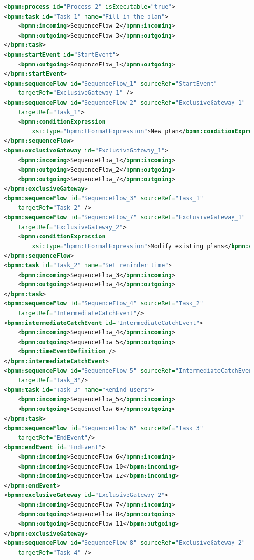 \documentclass[runningheads]{llncs}
\begin{document}
    \begin{lstlisting}[language={XML}]
        <bpmn:process id="Process_2" isExecutable="true">
<bpmn:task id="Task_1" name="Fill in the plan">
    <bpmn:incoming>SequenceFlow_2</bpmn:incoming>
    <bpmn:outgoing>SequenceFlow_3</bpmn:outgoing>
</bpmn:task>
<bpmn:startEvent id="StartEvent">
    <bpmn:outgoing>SequenceFlow_1</bpmn:outgoing>
</bpmn:startEvent>
<bpmn:sequenceFlow id="SequenceFlow_1" sourceRef="StartEvent"
    targetRef="ExclusiveGateway_1" />
<bpmn:sequenceFlow id="SequenceFlow_2" sourceRef="ExclusiveGateway_1"
    targetRef="Task_1">
    <bpmn:conditionExpression
        xsi:type="bpmn:tFormalExpression">New plan</bpmn:conditionExpression>
</bpmn:sequenceFlow>
<bpmn:exclusiveGateway id="ExclusiveGateway_1">
    <bpmn:incoming>SequenceFlow_1</bpmn:incoming>
    <bpmn:outgoing>SequenceFlow_2</bpmn:outgoing>
    <bpmn:outgoing>SequenceFlow_7</bpmn:outgoing>
</bpmn:exclusiveGateway>
<bpmn:sequenceFlow id="SequenceFlow_3" sourceRef="Task_1"
    targetRef="Task_2" />
<bpmn:sequenceFlow id="SequenceFlow_7" sourceRef="ExclusiveGateway_1"
    targetRef="ExclusiveGateway_2">
    <bpmn:conditionExpression
        xsi:type="bpmn:tFormalExpression">Modify existing plans</bpmn:conditionExpression>
</bpmn:sequenceFlow>
<bpmn:task id="Task_2" name="Set reminder time">
    <bpmn:incoming>SequenceFlow_3</bpmn:incoming>
    <bpmn:outgoing>SequenceFlow_4</bpmn:outgoing>
</bpmn:task>
<bpmn:sequenceFlow id="SequenceFlow_4" sourceRef="Task_2"
    targetRef="IntermediateCatchEvent"/>
<bpmn:intermediateCatchEvent id="IntermediateCatchEvent">
    <bpmn:incoming>SequenceFlow_4</bpmn:incoming>
    <bpmn:outgoing>SequenceFlow_5</bpmn:outgoing>
    <bpmn:timeEventDefinition />
</bpmn:intermediateCatchEvent>
<bpmn:sequenceFlow id="SequenceFlow_5" sourceRef="IntermediateCatchEvent"
    targetRef="Task_3"/>
<bpmn:task id="Task_3" name="Remind users">
    <bpmn:incoming>SequenceFlow_5</bpmn:incoming>
    <bpmn:outgoing>SequenceFlow_6</bpmn:outgoing>
</bpmn:task>
<bpmn:sequenceFlow id="SequenceFlow_6" sourceRef="Task_3"
    targetRef="EndEvent"/>
<bpmn:endEvent id="EndEvent">
    <bpmn:incoming>SequenceFlow_6</bpmn:incoming>
    <bpmn:incoming>SequenceFlow_10</bpmn:incoming>
    <bpmn:incoming>SequenceFlow_12</bpmn:incoming>
</bpmn:endEvent>
<bpmn:exclusiveGateway id="ExclusiveGateway_2">
    <bpmn:incoming>SequenceFlow_7</bpmn:incoming>
    <bpmn:outgoing>SequenceFlow_8</bpmn:outgoing>
    <bpmn:outgoing>SequenceFlow_11</bpmn:outgoing>
</bpmn:exclusiveGateway>
<bpmn:sequenceFlow id="SequenceFlow_8" sourceRef="ExclusiveGateway_2"
    targetRef="Task_4" />

\end{lstlisting}
\end{document}
